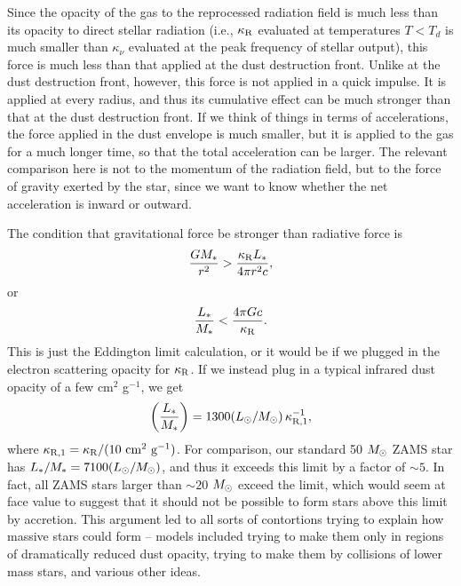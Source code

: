 Since the opacity of the gas to the reprocessed radiation field is much less than its opacity to direct stellar radiation (i.e., $\kappa_{\rm R}$ evaluated at temperatures $T<T_d$ is much smaller than $\kappa_{\nu}$ evaluated at the peak frequency of stellar output), this force is much less than that applied at the dust destruction front. Unlike at the dust destruction front, however, this force is not applied in a quick impulse. It is applied at every radius, and thus its cumulative effect can be much stronger than that at the dust destruction front. If we think of things in terms of accelerations, the force applied in the dust envelope is much smaller, but it is applied to the gas for a much longer time, so that the total acceleration can be larger. The relevant comparison here is not to the momentum of the radiation field, but to the force of gravity exerted by the star, since we want to know whether the net acceleration is inward or outward.

The condition that gravitational force be stronger than radiative force is
\begin{equation}
\frac{G M_*}{r^2} > \frac{\kappa_{\rm R} L_*}{4\pi r^2 c},
\end{equation}
or
\begin{equation}
\frac{L_*}{M_*} < \frac{4\pi G c}{\kappa_{\rm R}}.
\end{equation}
This is just the Eddington limit calculation, or it would be if we plugged in the electron scattering opacity for $\kappa_{\rm R}$.
If we instead plug in a typical infrared dust opacity of a few cm$^2$ g$^{-1}$, we get
\begin{equation}
\left(\frac{L_*}{M_*}\right) = 1300 (L_{\odot}/M_{\odot}) \,\kappa_{\rm R,1}^{-1},
\end{equation}
where $\kappa_{\rm R,1} = \kappa_{\rm R}/(10\mbox{ cm}^2\mbox{ g}^{-1})$.
For comparison, our standard 50 $M_{\odot}$ ZAMS star has $L_*/M_*= 7100 (L_{\odot}/M_{\odot})$, and thus it exceeds this limit by a factor of $\sim 5$. In fact, all ZAMS stars larger than $\sim 20$ $M_{\odot}$ exceed the limit, which would seem at face value to suggest that it should not be possible to form stars above this limit by accretion. This argument led to all sorts of contortions trying to explain how massive stars could form -- models included trying to make them only in regions of dramatically reduced dust opacity, trying to make them by collisions of lower mass stars, and various other ideas.

